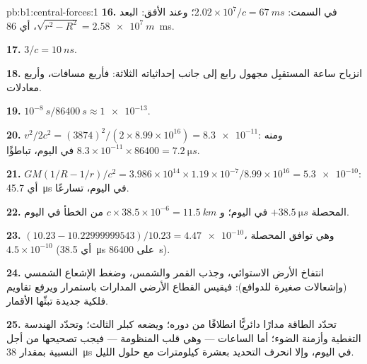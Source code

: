 \begin{solution}{pb:b1:central-forces:1}
\textbf{16.} في السمت: $2.02\times10^7/c = \qty{67}{ms}$؛ وعند الأفق: البعد
$\sqrt{r^2 - R^2} = \qty{2.58e7}{m}$، أي \qty{86}{ms}.

\textbf{17.} $3/c = \qty{10}{ns}$.

\textbf{18.} انزياح ساعة المستقبِل مجهول رابع إلى جانب
إحداثياته الثلاثة: فأربع مسافات، وأربع معادلات.

\textbf{19.} $10^{-8}\ \unit{s}/\qty{86400}{s} \approx \num{1e-13}$.

\textbf{20.} $v^2/2c^2 = (3874)^2/(2 \times 8.99\times10^{16}) = \num{8.3e-11}$:
ومنه $8.3\times10^{-11} \times 86400 = \qty{7.2}{\micro s}$ في اليوم، تباطؤًا.

\textbf{21.} $GM(1/R - 1/r)/c^2 = 3.986\times10^{14} \times 1.19\times10^{-7}/
8.99\times10^{16} = \num{5.3e-10}$: أي \qty{45.7}{\micro s} في اليوم، تسارعًا.

\textbf{22.} المحصلة $+\qty{38.5}{\micro s}$ في اليوم؛ و $c \times 38.5\times10^{-6}
= \qty{11.5}{km}$ من الخطأ في اليوم.

\textbf{23.} $(10.23 - 10.22999999543)/10.23 = \num{4.47e-10}$، وهي توافق
المحصلة $4.5\times10^{-10}$ (أي \qty{38.5}{\micro s} على \qty{86400}{s}).

\textbf{24.} انتفاخ الأرض الاستوائي، وجذب القمر والشمس،
وضغط الإشعاع الشمسي (وإشعالات صغيرة للدوافع): فيقيس
القطاع الأرضي المدارات باستمرار ويرفع تقاويم فلكية جديدة
تبثّها الأقمار.

\textbf{25.} تحدّد الطاقة  مدارًا دائريًّا انطلاقًا من
دوره؛ ويضعه كبلر الثالث؛ وتحدّد الهندسة التغطية وأزمنة الضوء؛
أما الساعات --- وهي قلب المنظومة --- فيجب تصحيحها من أجل
النسبية بمقدار \qty{38}{\micro s} في اليوم، وإلا انحرف التحديد بعشرة
كيلومترات مع حلول الليل.
\end{solution}
